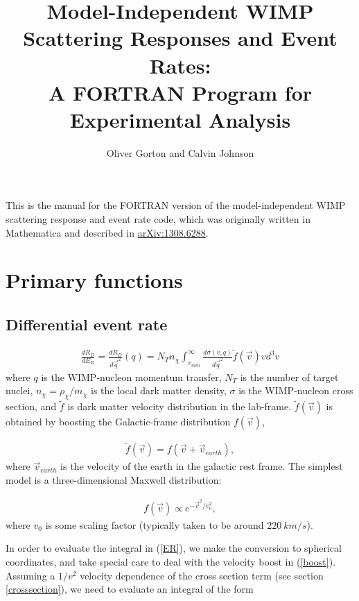 \documentclass[11pt]{amsart}
\title{Model-Independent WIMP Scattering Responses and Event Rates:\\ 
A FORTRAN Program for Experimental Analysis}
\author{Oliver Gorton and Calvin Johnson}
\begin{document}
\maketitle

\tableofcontents

This is the manual for the FORTRAN version of the model-independent WIMP scattering response and event rate code, which was originally written in Mathematica and described in \href{http://arxiv.org/abs/1308.6288v1}{arXiv:1308.6288}.

\section{Primary functions}

\subsection{Differential event rate}
\begin{equation}\label{ER}
\begin{split}
	\frac{dR_D}{dE_R} = \frac{dR_D}{d\vec{q}^2}(q)
	 = N_T n_\chi \int_{v_{min}}^\infty \frac{d\sigma(v,q)}{d\vec{q}^2} \tilde{f}(\vec{v})vd^3v
\end{split}
\end{equation}
where $q$ is the WIMP-nucleon momentum transfer, $N_T$ is the number of target nuclei, $n_\chi = \rho_\chi/m_\chi$ is the local dark matter density, $\sigma$ is the WIMP-nucleon cross section, and $\tilde{f}$ is dark matter velocity distribution in the lab-frame. $\tilde{f}(\vec{v})$ is obtained by boosting the Galactic-frame distribution $f(\vec{v})$, 

\begin{equation}\label{boost}
\begin{split}
	\tilde{f}(\vec{v}) = f(\vec{v} + \vec{v}_{earth}),
\end{split}
\end{equation}
where $\vec{v}_{earth}$ is the velocity of the earth in the galactic rest frame. The simplest model is a three-dimensional Maxwell distribution:

\begin{equation}
\begin{split}
	f(\vec{v}) \propto e^{-\vec{v}^2/v_0^2},
\end{split}
\end{equation}
where $v_0$ is some scaling factor (typically taken to be around $220\ km/s$).

In order to evaluate the integral in (\ref{ER}), we make the conversion to spherical coordinates, and take special care to deal with the velocity boost in (\ref{boost}). Assuming a $1/v^2$ velocity dependence of the cross section term (see section \ref{crosssection}), we need to evaluate an integral of the form
\end{document}
